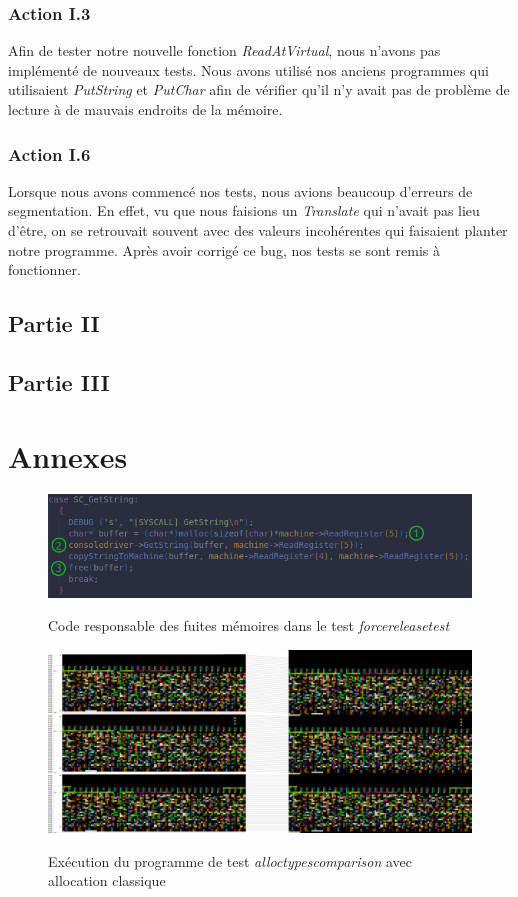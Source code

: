 \documentclass{article}
\begin{document}
\subsubsection{Action I.3}
Afin de tester notre nouvelle fonction \textit{ReadAtVirtual}, nous n'avons pas implémenté de nouveaux tests. Nous avons utilisé nos anciens programmes 
qui utilisaient \textit{PutString} et \textit{PutChar} afin de vérifier qu'il n'y avait pas de problème de lecture à de mauvais endroits de la mémoire.

\subsubsection{Action I.6}
Lorsque nous avons commencé nos tests, nous avions beaucoup d'erreurs de segmentation. En effet, vu que nous faisions un \textit{Translate} qui n'avait pas lieu d'être, on se retrouvait souvent
avec des valeurs incohérentes qui faisaient planter notre programme. Après avoir corrigé ce bug, nos tests se sont remis à fonctionner.

\subsection{Partie II}

\subsection{Partie III}

\section{Annexes}
\begin{figure}[h]
    \caption{Code responsable des fuites mémoires dans le test \textit{forcereleasetest}}
    \centering
    \includegraphics[width=\textwidth,height=\textheight,keepaspectratio]{Leak}
    \label{fig:fuites}
\end{figure}

\begin{figure}[h]
    \caption{Exécution du programme de test \textit{alloctypescomparison} avec allocation classique}
    \centering
    \includegraphics[width=\textwidth,height=\textheight,keepaspectratio]{memory_classic}
    \label{fig:alloc_classic}
\end{figure}
\end{document}
